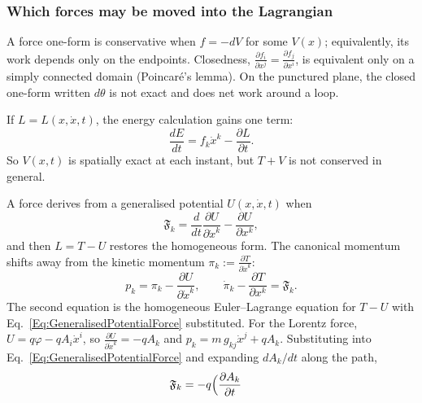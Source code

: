 \subsubsection*{Which forces may be moved into the Lagrangian}
\begin{description}\itemsep3pt
\item[Conservative means exact.] A force one-form is conservative when
  $f=-dV$ for some $V(x)$; equivalently, its work depends only on the
  endpoints. Closedness,
  $\frac{\partial f_i}{\partial x^j}=\frac{\partial f_j}{\partial x^i}$, is
  equivalent only on a simply connected domain (Poincar\'e's lemma). On the
  punctured plane, the closed one-form written $d\theta$ is not exact and
  does net work around a loop.
\item[Time dependence.] If $L=L(x,\dot x,t)$, the energy calculation gains
  one term:
  \begin{equation}\label{Eq:ForcedTimeDependentEnergyBalance}
   \frac{dE}{dt}=f_k\dot x^k-\frac{\partial L}{\partial t}.
  \end{equation}
  So $V(x,t)$ is spatially exact at each instant, but $T+V$ is not
  conserved in general.
\item[Velocity dependence.] A force derives from a generalised potential
  $U(x,\dot x,t)$ when
  \begin{equation}\label{Eq:GeneralisedPotentialForce}
   \mathfrak F_k=\frac{d}{dt}\frac{\partial U}{\partial\dot x^k}
     -\frac{\partial U}{\partial x^k},
  \end{equation}
  and then $L=T-U$ restores the homogeneous form. The canonical momentum
  shifts away from the kinetic momentum
  $\pi_k:=\frac{\partial T}{\partial\dot x^k}$:
  \begin{equation}\label{Eq:CanonicalAndKineticMomentum}
   p_k=\pi_k-\frac{\partial U}{\partial\dot x^k},
   \qquad
   \dot\pi_k-\frac{\partial T}{\partial x^k}=\mathfrak F_k .
  \end{equation}
  The second equation is the homogeneous Euler--Lagrange equation for $T-U$
  with Eq.~\ref{Eq:GeneralisedPotentialForce} substituted.
  For the Lorentz force, $U=q\varphi-qA_i\dot x^i$, so
  $\frac{\partial U}{\partial\dot x^k}=-qA_k$ and
  $p_k=m\,g_{kj}\dot x^j+qA_k$. Substituting into
  Eq.~\ref{Eq:GeneralisedPotentialForce} and expanding $dA_k/dt$ along the
  path,
  \begin{equation}\label{Eq:LorentzForceFromGeneralisedPotential}
  \begin{aligned}
   \mathfrak F_k
    &=-q\Bigl(\frac{\partial A_k}{\partial t}

\end{aligned}
\end{equation}
\end{description}
